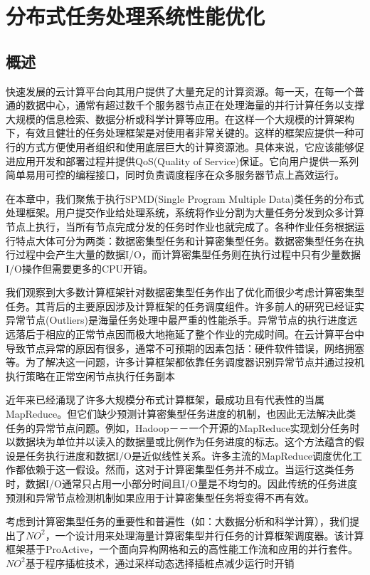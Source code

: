 \chapter{分布式任务处理系统性能优化}
\label{cha:task}

\section{概述}
\label{sec:another}
快速发展的云计算平台向其用户提供了大量充足的计算资源。每一天，在每一个普通的数据中心，通常有超过数千个服务器节点正在处理海量的并行计算任务以支撑大规模的信息检索、数据分析或科学计算等应用。在这样一个大规模的计算架构下，有效且健壮的任务处理框架是对使用者非常关键的。这样的框架应提供一种可行的方式方便使用者组织和使用底层巨大的计算资源池。具体来说，它应该能够促进应用开发和部署过程并提供QoS(Quality of Service)保证。它向用户提供一系列简单易用可控的编程接口，同时负责调度程序在众多服务器节点上高效运行。

在本章中，我们聚焦于执行SPMD(Single Program Multiple Data)类任务的分布式处理框架。用户提交作业给处理系统，系统将作业分割为大量任务分发到众多计算节点上执行，当所有节点完成分发的任务时作业也就完成了。各种作业任务根据运行特点大体可分为两类：数据密集型任务和计算密集型任务。数据密集型任务在执行过程中会产生大量的数据I/O，而计算密集型任务则在执行过程中只有少量数据I/O操作但需要更多的CPU开销。

我们观察到大多数计算框架针对数据密集型任务作出了优化而很少考虑计算密集型任务。其背后的主要原因涉及计算框架的任务调度组件。许多前人的研究\cite{Zaharia:2008:IMP:1855741.1855744, Ananthanarayanan:2010:ROM:1924943.1924962}已经证实异常节点(Outliers)是海量任务处理中最严重的性能杀手。异常节点的执行进度远远落后于相应的正常节点因而极大地拖延了整个作业的完成时间。在云计算平台中导致节点异常的原因有很多，通常不可预期的因素包括：硬件软件错误，网络拥塞等。为了解决这一问题，许多计算框架都依靠任务调度器识别异常节点并通过投机执行策略在正常空闲节点执行任务副本

近年来已经涌现了许多大规模分布式计算框架，最成功且有代表性的当属MapReduce。但它们缺少预测计算密集型任务进度的机制，也因此无法解决此类任务的异常节点问题。例如，Hadoop－－一个开源的MapReduce实现划分任务时以数据块为单位并以读入的数据量或比例作为任务进度的标志。这个方法蕴含的假设是任务执行进度和数据I/O是近似线性关系。许多主流的MapReduce调度优化工作都依赖于这一假设。然而，这对于计算密集型任务并不成立。当运行这类任务时，数据I/O通常只占用一小部分时间且I/O量是不均匀的。因此传统的任务进度预测和异常节点检测机制如果应用于计算密集型任务将变得不再有效。

考虑到计算密集型任务的重要性和普遍性（如：大数据分析和科学计算），我们提出了$NO^2$，一个设计用来处理海量计算密集型并行任务的计算框架调度器。该计算框架基于ProActive，一个面向异构网格和云的高性能工作流和应用的并行套件。$NO^2$基于程序插桩技术，通过采样动态选择插桩点减少运行时开销

